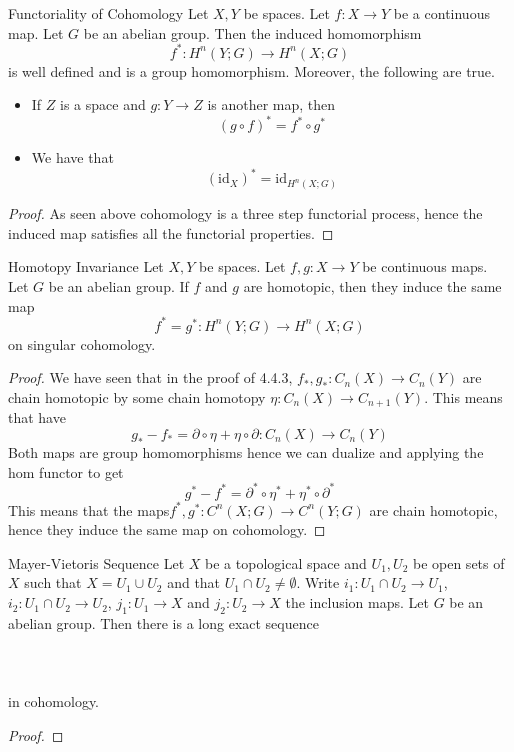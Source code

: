 \documentclass[a4paper]{article}
\begin{document}
\begin{thm}{Functoriality of Cohomology}{} Let $X,Y$ be spaces. Let $f:X\to Y$ be a continuous map. Let $G$ be an abelian group. Then the induced homomorphism $$f^\ast:H^n(Y;G)\to H^n(X;G)$$ is well defined and is a group homomorphism. Moreover, the following are true. 
\begin{itemize}
\item If $Z$ is a space and $g:Y\to Z$ is another map, then $$(g\circ f)^\ast=f^\ast\circ g^\ast$$
\item We have that $$(\text{id}_X)^\ast=\text{id}_{H^n(X;G)}$$
\end{itemize} \tcbline
\begin{proof}
As seen above cohomology is a three step functorial process, hence the induced map satisfies all the functorial properties. 
\end{proof}
\end{thm}

\begin{thm}{Homotopy Invariance}{} Let $X,Y$ be spaces. Let $f,g:X\to Y$ be continuous maps. Let $G$ be an abelian group. If $f$ and $g$ are homotopic, then they induce the same map $$f^\ast=g^\ast:H^n(Y;G)\to H^n(X;G)$$ on singular cohomology. \tcbline
\begin{proof}
We have seen that in the proof of 4.4.3, $f_\ast,g_\ast:C_n(X)\to C_n(Y)$ are chain homotopic by some chain homotopy $\eta:C_n(X)\to C_{n+1}(Y)$. This means that have $$g_\ast-f_\ast=\partial\circ\eta+\eta\circ\partial:C_n(X)\to C_n(Y)$$ Both maps are group homomorphisms hence we can dualize and applying the hom functor to get $$g^\ast-f^\ast=\partial^\ast\circ\eta^\ast+\eta^\ast\circ\partial^\ast$$ This means that the maps$f^\ast,g^\ast:C^n(X;G)\to C^n(Y;G)$ are chain homotopic, hence they induce the same map on cohomology. 
\end{proof}
\end{thm}

\begin{thm}{Mayer-Vietoris Sequence}{} Let $X$ be a topological space and $U_1,U_2$ be open sets of $X$ such that $X=U_1\cup U_2$ and that $U_1\cap U_2\neq\emptyset$. Write $i_1:U_1\cap U_2\to U_1$, $i_2:U_1\cap U_2\to U_2$, $j_1:U_1\to X$ and $j_2:U_2\to X$ the inclusion maps. Let $G$ be an abelian group. Then there is a long exact sequence \\~\\
\\~\\
in cohomology. \tcbline
\begin{proof}

\end{proof}
\end{thm}
\end{document}
